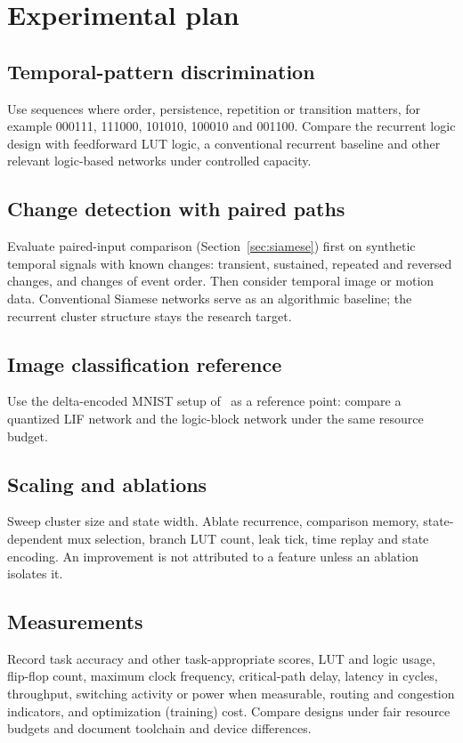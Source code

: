 \section{Experimental plan}
\label{sec:experiments}

\subsection{Temporal-pattern discrimination}
Use sequences where order, persistence, repetition or transition matters, for example 000111, 111000, 101010, 100010 and 001100. Compare the recurrent logic design with feedforward LUT logic, a conventional recurrent baseline and other relevant logic-based networks under controlled capacity.

\subsection{Change detection with paired paths}
Evaluate paired-input comparison (Section~\ref{sec:siamese}) first on synthetic temporal signals with known changes: transient, sustained, repeated and reversed changes, and changes of event order. Then consider temporal image or motion data. Conventional Siamese networks serve as an algorithmic baseline; the recurrent cluster structure stays the research target.

\subsection{Image classification reference}
Use the delta-encoded MNIST setup of~\cite{windhager2024} as a reference point: compare a quantized LIF network and the logic-block network under the same resource budget.

\subsection{Scaling and ablations}
Sweep cluster size and state width. Ablate recurrence, comparison memory, state-dependent mux selection, branch LUT count, leak tick, time replay and state encoding. An improvement is not attributed to a feature unless an ablation isolates it.

\subsection{Measurements}
Record task accuracy and other task-appropriate scores, LUT and logic usage, flip-flop count, maximum clock frequency, critical-path delay, latency in cycles, throughput, switching activity or power when measurable, routing and congestion indicators, and optimization (training) cost. Compare designs under fair resource budgets and document toolchain and device differences.
